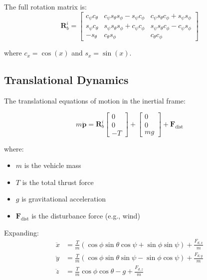 The full rotation matrix is:
\begin{equation}
    \mathbf{R}_{b}^{i} = \begin{bmatrix}
        c_\psi c_\theta & c_\psi s_\theta s_\phi - s_\psi c_\phi & c_\psi s_\theta c_\phi + s_\psi s_\phi \\
        s_\psi c_\theta & s_\psi s_\theta s_\phi + c_\psi c_\phi & s_\psi s_\theta c_\phi - c_\psi s_\phi \\
        -s_\theta & c_\theta s_\phi & c_\theta c_\phi
    \end{bmatrix}
\end{equation}

where $c_x = \cos(x)$ and $s_x = \sin(x)$.

\subsection{Translational Dynamics}

The translational equations of motion in the inertial frame:

\begin{equation}
    m \ddot{\mathbf{p}} = \mathbf{R}_{b}^{i} \begin{bmatrix} 0 \\ 0 \\ -T \end{bmatrix} + \begin{bmatrix} 0 \\ 0 \\ mg \end{bmatrix} + \mathbf{F}_{\text{dist}}
\end{equation}

where:
\begin{itemize}
    \item $m$ is the vehicle mass
    \item $T$ is the total thrust force
    \item $g$ is gravitational acceleration
    \item $\mathbf{F}_{\text{dist}}$ is the disturbance force (e.g., wind)
\end{itemize}

Expanding:
\begin{align}
    \ddot{x} &= \frac{T}{m}(\cos\phi\sin\theta\cos\psi + \sin\phi\sin\psi) + \frac{F_{d,x}}{m} \\
    \ddot{y} &= \frac{T}{m}(\cos\phi\sin\theta\sin\psi - \sin\phi\cos\psi) + \frac{F_{d,y}}{m} \\
    \ddot{z} &= \frac{T}{m}\cos\phi\cos\theta - g + \frac{F_{d,z}}{m}
\end{align}

